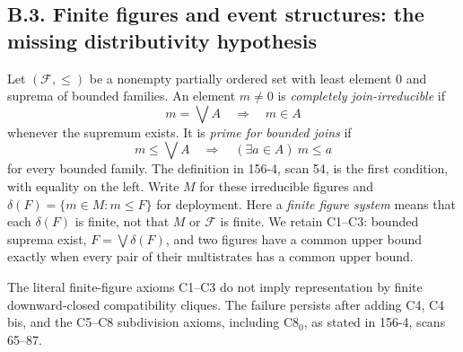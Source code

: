 
\subsection{B.3. Finite figures and event structures: the missing distributivity hypothesis}

\begin{definition}\label{SA21-BM-def-prime}
Let \((\mathcal F,\leq)\) be a nonempty partially ordered set with least
element \(0\) and suprema of bounded families. An element \(m\ne0\) is
\emph{completely join-irreducible} if
\[
 m=\bigvee A\quad\Longrightarrow\quad m\in A
\]
whenever the supremum exists. It is \emph{prime for bounded joins} if
\[
 m\leq\bigvee A\quad\Longrightarrow\quad
 (\exists a\in A)\ m\leq a
\]
for every bounded family. The definition in 156-4, scan 54, is the
first condition, with equality on the left. Write \(M\) for these
irreducible figures and \(\delta(F)=\{m\in M:m\leq F\}\) for deployment.
Here a \emph{finite figure system} means that each \(\delta(F)\) is
finite, not that \(M\) or \(\mathcal F\) is finite. We retain C1--C3:
bounded suprema exist, \(F=\bigvee\delta(F)\), and two figures have
a common upper bound exactly when every pair of their multistrates
has a common upper bound.
\end{definition}

\begin{counterexample}\label{SA21-BM-r12}
The literal finite-figure axioms C1--C3 do not imply representation
by finite downward-closed compatibility cliques. The failure persists
after adding C4, C4 bis, and the C5--C8 subdivision axioms, including
C8\(_0\), as stated in 156-4, scans 65--87.
\end{counterexample}

